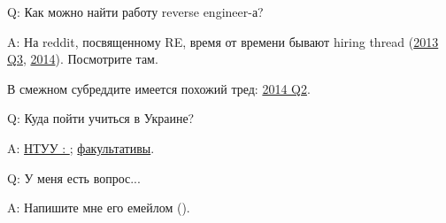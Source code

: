 \par Q: Как можно найти работу reverse engineer-а?
\par A: На reddit, посвященному RE\FNURLREDDIT, время от времени бывают hiring thread (\href{http://go.yurichev.com/17333}{2013 Q3}, \href{http://go.yurichev.com/17334}{2014}).
Посмотрите там.

В смежном субреддите  имеется похожий тред: \href{http://go.yurichev.com/17335}{2014 Q2}.

\par Q: Куда пойти учиться в Украине?
\par A: \href{http://go.yurichev.com/17336}{НТУУ : };
\href{http://go.yurichev.com/17337}{факультативы}.

\par Q: У меня есть вопрос...
\par A: Напишите мне его емейлом (\EMAIL).
